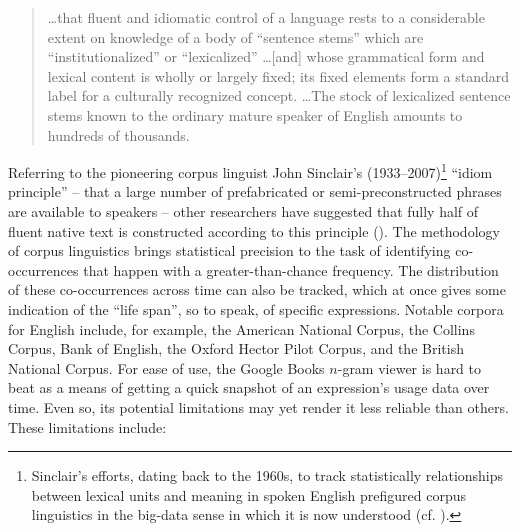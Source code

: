 \documentclass[english,output=paper,colorlinks,citecolor=brown]{../langscibook}
\begin{document}
\begin{quote}
…that fluent and idiomatic control of a language rests to a considerable extent on knowledge of a body of ``sentence stems'' which are ``institutionalized'' or ``lexicalized'' …[and] whose grammatical form and lexical content is wholly or largely fixed; its fixed elements form a standard label for a culturally recognized concept. …The stock of lexicalized sentence stems known to the ordinary mature speaker of English amounts to hundreds of thousands.  
\end{quote}

Referring to the pioneering corpus linguist John Sinclair’s (1933--2007)\footnote{Sinclair’s efforts, dating back to the 1960s, to track statistically relationships between lexical units and meaning in spoken English prefigured corpus linguistics in the big-data sense in which it is now understood (cf. \citealt{Stubbs2013}).} ``idiom principle'' – that a large number of prefabricated or semi-preconstructed phrases are available to speakers – other researchers have suggested that fully half of fluent native text is constructed according to this principle (\citealt[29]{ErmanWarren2000}). The methodology of corpus linguistics brings statistical precision to the task of identifying co-occurrences that happen with a greater-than-chance frequency.  The distribution of these co-occurrences across time can also be tracked, which at once gives some indication of the ``life span'', so to speak, of specific expressions. Notable corpora for English include, for example, the American National Corpus, the Collins Corpus, Bank of English, the Oxford Hector Pilot Corpus, and the British National Corpus. For ease of use, the Google Books $n$-gram viewer is hard to beat as a means of getting a quick snapshot of an expression’s usage data over time.  Even so, its potential limitations may yet render it less reliable than others. These limitations include: 
\end{document}
